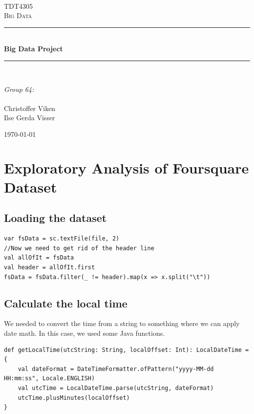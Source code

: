 \documentclass[abstract=on]{article}
\title{\mytitle}
\author{\myauthor}
\date{\today}
\newcommand{\mytitle}{Big Data Project}
\newcommand{\mygroupnumber}{64}
\newcommand{\myauthor}{Christoffer Viken\\Ilse Gerda Visser}
\begin{document}
\begin{titlepage}
\begin{center}


~\\[1.5cm]

\textsc{\Large TDT4305\\Big Data}\\[0.5cm]

\hrule ~\\[0.2cm]
{\huge \bfseries \mytitle}\\[0.4cm]   %
\hrule ~\\[1.5cm]

\begin{minipage}{0.4\textwidth}
    \centering
  \large
    \emph{Group \mygroupnumber:}\\~\\
    \myauthor
\end{minipage}

\vfill

{\large \today}
\end{center}
\end{titlepage}




\section{Exploratory Analysis of Foursquare Dataset}

\subsection{Loading the dataset}
\begin{lstlisting}
var fsData = sc.textFile(file, 2)
//Now we need to get rid of the header line
val allOfIt = fsData
val header = allOfIt.first
fsData = fsData.filter(_ != header).map(x => x.split("\t"))
\end{lstlisting}

\subsection{Calculate the local time}
We needed to convert the time from a string to something where we can apply date math.
In this case, we used some Java functions.
\begin{lstlisting}
def getLocalTime(utcString: String, localOffset: Int): LocalDateTime = {
    val dateFormat = DateTimeFormatter.ofPattern("yyyy-MM-dd HH:mm:ss", Locale.ENGLISH)
    val utcTime = LocalDateTime.parse(utcString, dateFormat)
    utcTime.plusMinutes(localOffset)
}
\end{lstlisting}
\end{document}

